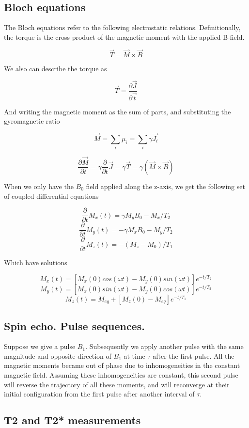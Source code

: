 \documentclass[12pt]{article}
\begin{document}
\subsection{Bloch equations}

The Bloch equations refer to the following electrostatic relations. Definitionally, the torque is the cross product of the magnetic moment with the applied B-field.

\[\vec{T} = \vec{M} \times \vec{B}\]

We also can describe the torque as

\[ \vec{T} = \frac{\partial{\vec{J}}}{\partial{\vec{t}}}\]

And writing the magnetic moment as the sum of parts, and substituting the gyromagnetic ratio

\[\vec{M} = \sum_i\mu_i = \sum_i\gamma \vec{J_i}\]

\[ \frac{\partial \vec{M}}{\partial t} = \gamma \frac{\partial}{\partial t}\vec{J} = \gamma \vec{T} = \gamma(\vec{M} \times \vec{B})\]

When we only have the $B_0$ field applied along the z-axis, we get the following set of coupled differential equations

\[ \frac{\partial}{\partial t} M_x(t) = \gamma M_y B_0 - M_x/T_2\]
\[ \frac{\partial}{\partial t} M_y(t) = -\gamma M_x B_0 - M_y/T_2\]
\[ \frac{\partial}{\partial t} M_z(t) = -(M_z - M_0)/T_1\]

Which have solutions

\[M_x(t) = [M_x(0)cos(\omega t) - M_y(0)sin(\omega t)]e^{-t/T_2}\]
\[M_y(t) = [M_x(0)sin(\omega t) - M_y(0)cos(\omega t)]e^{-t/T_2}\]
\[M_z(t) = M_{eq} + [M_z(0) - M_{eq}]e^{-t/T_1}\]




\subsection{Spin echo. Pulse sequences.}

Suppose we give a pulse $B_1$. Subsequently we apply another pulse with the same magnitude and opposite direction of $B_1$ at time $\tau$ after the first pulse. All the magnetic moments became out of phase due to inhomogeneities in the constant magnetic field. Assuming these inhomogeneities are constant, this second pulse will reverse the trajectory of all these moments, and will reconverge at their initial configuration from the first pulse after another interval of $\tau$.

\subsection{T2 and T2* measurements}
\end{document}
